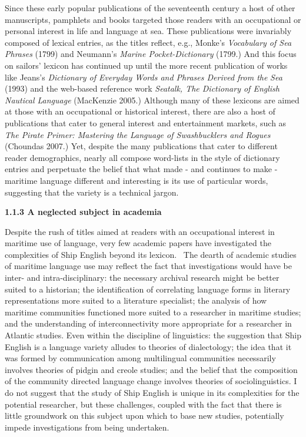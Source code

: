 \begin{styleNormali}
Since these early popular publications of the seventeenth century a host of other manuscripts, pamphlets and books targeted those readers with an occupational or personal interest in life and language at sea. These publications were invariably composed of lexical entries, as the titles reflect, e.g., Monke’s \textit{Vocabulary of Sea Phrases} (1799) and Neumann’s \textit{Marine Pocket-Dictionary }(1799.) And this focus on sailors’ lexicon has continued up until the more recent publication of works like Jeans’s \textit{Dictionary of Everyday Words and Phrases Derived from the }\textit{S}\textit{ea} (1993) and the web-based reference work \textit{Seatalk, The Dictionary of English Nautical Language }(MacKenzie 2005.) Although many of these lexicons are aimed at those with an occupational or historical interest, there are also a host of publications that cater to general interest and entertainment markets, such as \textit{The Pirate Primer: Mastering the Language of Swashbucklers and Rogues }(Choundas 2007.) Yet, despite the many publications that cater to different reader demographics, nearly all compose word-lists in the style of dictionary entries and perpetuate the belief that what made - and continues to make - maritime language different and interesting is its use of particular words, suggesting that the variety is a technical jargon. 
\end{styleNormali}


\begin{styleNormali}
\textbf{1.1.3 A neglected subject in academia}
\end{styleNormali}


\begin{styleNormali}
Despite the rush of titles aimed at readers with an occupational interest in maritime use of language, very few academic papers have investigated the complexities of Ship English beyond its lexicon. \ The dearth of academic studies of maritime language use may reflect the fact that investigations would have be inter- and intra-disciplinary: the necessary archival research might be better suited to a historian; the identification of correlating language forms in literary representations more suited to a literature specialist; the analysis of how maritime communities functioned more suited to a researcher in maritime studies; and the understanding of interconnectivity more appropriate for a researcher in Atlantic studies. Even within the discipline of linguistics: the suggestion that Ship English is a language variety alludes to theories of dialectology; the idea that it was formed by communication among multilingual communities necessarily involves theories of pidgin and creole studies; and the belief that the composition of the community directed language change involves theories of sociolinguistics. I do not suggest that the study of Ship English is unique in its complexities for the potential researcher, but these challenges, coupled with the fact that there is little groundwork on this subject upon which to base new studies, potentially impede investigations from being undertaken. 
\end{styleNormali}


